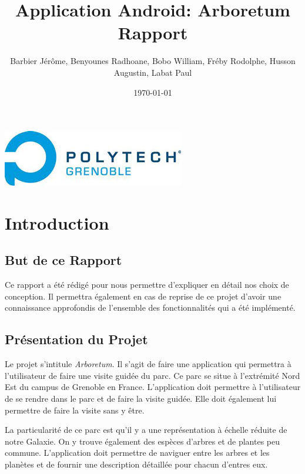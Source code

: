 \documentclass[a4paper,11pt]{article}
\title{Application Android: Arboretum\\
Rapport}
\author{Barbier Jérôme, Benyounes Radhoane, Bobo William, Fréby Rodolphe, Husson Augustin, Labat Paul}
\date{\today}
\begin{document}
   \maketitle

  \begin{center}
    \includegraphics{logoPol.jpg}\\
  \end{center}
  \tableofcontents
  \newpage
  
  \section{Introduction}
    \subsection{But de ce Rapport}
  Ce rapport a été rédigé pour nous permettre d'expliquer en détail nos choix de conception. Il permettra également en cas de reprise de ce projet 
  d'avoir une connaissance approfondis de l'ensemble des fonctionnalités qui a été implémenté.
  
    \subsection{Présentation du Projet}
    Le projet s'intitule \textit{Arboretum}. Il s'agit de faire une application qui permettra à l'utilisateur de faire une visite guidée du parc.
    Ce parc se situe à l'extrémité Nord Est du campus de Grenoble en France. L'application doit permettre à l'utilisateur de se rendre dans le parc
    et de faire la visite guidée. Elle doit également lui permettre de faire la visite sans y être. 
    
    La particularité de ce parc est qu'il y a une représentation à échelle réduite de notre Galaxie. On y trouve également des espèces d'arbres et de plantes
    peu commune. L'application doit permettre de naviguer entre les arbres et les planètes et de fournir une description détaillée pour chacun d'entres eux.
\end{document}
